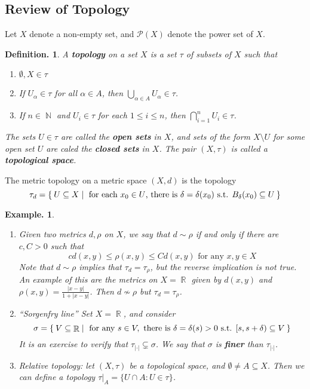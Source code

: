 \documentclass[11pt, a4paper]{memoir}
\DeclareMathOperator{\N}{{\mathbb{N}}}
\DeclareMathOperator{\R}{{\mathbb{R}}}
\newcommand{\abs}[1]{\ensuremath{\left\lvert#1\right\rvert}}
\theoremstyle{change}
\theoremstyle{plain}
\theoremstyle{nonumberplain}
\newtheorem{definition}{Definition.}
\newtheorem{example}{Example.}
\DeclareMathOperator{\B}{{\mathcal{B}}}
\numberwithin{equation}{section}
\begin{document}
\subsection{Review of Topology}
Let $X$ denote a non-empty set, and $\mathcal{P}(X)$ denote the power set of $X$.
\begin{definition}
    A \textbf{topology} on a set $X$ is a set $\tau$ of subsets of $X$ such that
    \begin{enumerate}[nl,r]
        \item $\emptyset,X\in\tau$
        \item If $U_\alpha\in\tau$ for all $\alpha\in A$, then $\bigcup_{\alpha\in A}U_\alpha\in\tau$.
        \item If $n\in\N$ and $U_i\in\tau$ for each $1\leq i\leq n$, then $\bigcap_{i=1}^n U_i\in\tau$.
    \end{enumerate}
    The sets $U\in\tau$ are called the \textbf{open sets} in $X$, and sets of the form $X\setminus U$ for some open set $U$ are caled the \textbf{closed sets} in $X$.
    The pair $(X,\tau)$ is called a \textbf{topological space}.
\end{definition}
The metric topology on a metric space $(X,d)$ is the topology
\begin{equation*}
    \tau_d = \Set{U\subseteq X |\text{ for each }x_0\in U\text{, there is }\delta=\delta(x_0)\text{ s.t. }\\B_\delta(x_0)\subseteq U}
\end{equation*}
\begin{example}
    \begin{enumerate}[r]
        \item Given two metrics $d,\rho$ on $X$, we say that $d\sim\rho$ if and only if there are $c,C>0$ such that
            \begin{equation*}
                cd(x,y)\leq\rho(x,y)\leq Cd(x,y)\text{ for any }x,y\in X
            \end{equation*}
            Note that $d\sim\rho$ implies that $\tau_d=\tau_\rho$, but the reverse implication is not true.
            An example of this are the metrics on $X=\R$ given by $d(x,y)$ and $\rho(x,y)=\frac{|x-y|}{1+|x-y|}$.
            Then $d\not\sim\rho$ but $\tau_d=\tau_\rho$.
        \item ``Sorgenfry line''
            Set $X=\R$, and consider
            \begin{equation*}
                \sigma=\Set{V\subseteq\R | \text{ for any }s\in V,\text{ there is }\delta=\delta(s)>0\text{ s.t. }[s,s+\delta)\subseteq V}
            \end{equation*}
            It is an exercise to verify that $\tau_{\abs{\cdot}}\subsetneq\sigma$.
            We say that $\sigma$ is \textbf{finer} than $\tau_{\abs{\cdot}}$.
        \item Relative topology: let $(X,\tau)$ be a topological space, and $\emptyset\neq A\subseteq X$.
            Then we can define a topology $\tau|_A=\{U\cap A:U\in\tau\}$.
    \end{enumerate}
\end{example}
\end{document}
